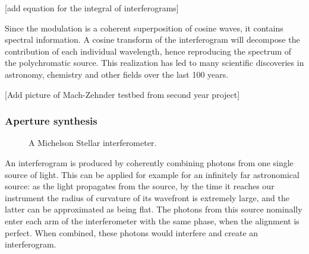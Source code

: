[add equation for the integral of interferograms]

Since the modulation is a coherent superposition of cosine waves, it contains spectral information. A cosine transform of the interferogram will decompose the contribution of each individual wavelength, hence reproducing the spectrum of the polychromatic source. This realization has led to many scientific discoveries in astronomy, chemistry and other fields over the last 100 years.

[Add picture of Mach-Zehnder testbed from second year project]

\subsubsection{Aperture synthesis}


\begin{figure}[!ht]
	\centering
	
	\caption[Michelson Stellar interferometer]{A Michelson Stellar interferometer.}
	\label{fig:interferometer}
    \end{figure}


An interferogram is produced by coherently combining photons from one single source of light. This can be applied for example for an infinitely far astronomical source: as the light propagates from the source, by the time it reaches our instrument the radius of curvature of its wavefront is extremely large, and the latter can be approximated as being flat. The photons from this source nominally enter each arm of the interferometer with the same phase, when the alignment is perfect. When combined, these photons would interfere and create an interferogram.




